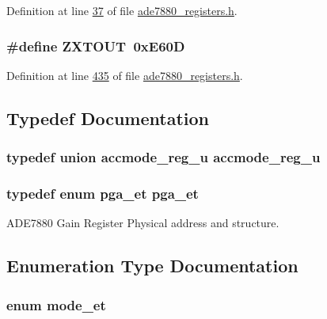Definition at line \hyperlink{a00036_source_l00037}{37} of file \hyperlink{a00036_source}{ade7880\-\_\-registers.\-h}.

\hypertarget{a00036_a29659e274070aaec5da2ad7752f60a51}{
\subsubsection[{Z\-X\-T\-O\-U\-T}]{\setlength{\rightskip}{0pt plus 5cm}\#define Z\-X\-T\-O\-U\-T~0x\-E60\-D}}\label{de/d8c/a00036_a29659e274070aaec5da2ad7752f60a51}


Definition at line \hyperlink{a00036_source_l00435}{435} of file \hyperlink{a00036_source}{ade7880\-\_\-registers.\-h}.



\subsection{Typedef Documentation}
\hypertarget{a00036_ac9ade8535a4f8c8b65b447e7aaac2700}{
\subsubsection[{accmode\-\_\-reg\-\_\-u}]{\setlength{\rightskip}{0pt plus 5cm}typedef union {\bf accmode\-\_\-reg\-\_\-u} {\bf accmode\-\_\-reg\-\_\-u}}}\label{de/d8c/a00036_ac9ade8535a4f8c8b65b447e7aaac2700}
\hypertarget{a00036_a07511a3a5ff578314792d6df1c7cc5e4}{
\subsubsection[{pga\-\_\-et}]{\setlength{\rightskip}{0pt plus 5cm}typedef enum {\bf pga\-\_\-et} {\bf pga\-\_\-et}}}\label{de/d8c/a00036_a07511a3a5ff578314792d6df1c7cc5e4}


A\-D\-E7880 Gain Register Physical address and structure. 



\subsection{Enumeration Type Documentation}
\hypertarget{a00036_a2f9fad1776ad62bb8d7627582ecf8fd5}{
\subsubsection[{mode\-\_\-et}]{\setlength{\rightskip}{0pt plus 5cm}enum {\bf mode\-\_\-et}}}\label{de/d8c/a00036_a2f9fad1776ad62bb8d7627582ecf8fd5}


